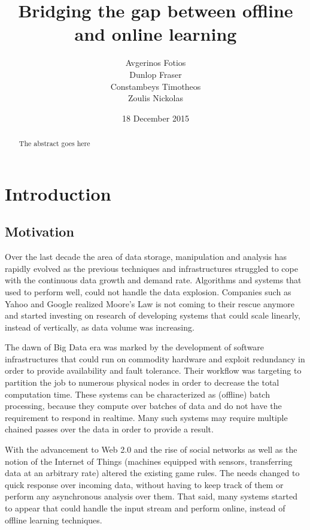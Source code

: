 \documentclass{lmproj}
\begin{document}
\title{Bridging the gap between offline and online learning}
\author{Avgerinos Fotios \\
        Dunlop Fraser \\
        Constambeys Timotheos \\
        Zoulis Nickolas}
\date{18 December 2015}
\maketitle
\begin{abstract}

The abstract goes here

\end{abstract}
\educationalconsent
\tableofcontents
\chapter{Introduction}
\label{intro}

\section{Motivation}
\label{intro}

Over the last decade the area of data storage, manipulation and analysis has rapidly evolved as the previous techniques and infrastructures struggled to cope with the continuous data growth and demand rate. Algorithms and systems that used to perform well, could not handle the data explosion. Companies such as Yahoo and Google realized Moore's Law is not coming to their rescue anymore and started investing on research of developing systems that could scale linearly, instead of vertically, as data volume was increasing. 

The dawn of Big Data era was marked by the development of software infrastructures that could run on commodity hardware and exploit redundancy in order to provide availability and fault tolerance. Their workflow was targeting to partition the job to numerous physical nodes in order to decrease the total computation time. These systems can be characterized as (offline) batch processing, because they compute over batches of data and do not have the requirement to respond in realtime. Many such systems may require multiple chained passes over the data in order to provide a result.

With the advancement to Web 2.0 and the rise of social networks as well as the notion of the Internet of Things (machines equipped with sensors, transferring data at an arbitrary rate) altered the existing game rules. The needs changed to quick response over incoming data, without having to keep track of them or perform any asynchronous analysis over them. That said, many systems started to appear that could handle the input stream and perform online, instead of offline learning techniques. 
\end{document}

